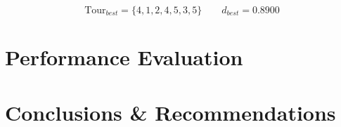 \documentclass[a4paper]{article}
\begin{document}
$$
\text{Tour}_{best} = \{4, 1, 2, 4, 5, 3, 5\} \qquad d_{best} = 0.8900
$$

\section{Performance Evaluation}







\section{Conclusions \& Recommendations}


\end{document}
